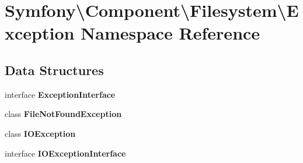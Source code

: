 \section{Symfony\textbackslash{}Component\textbackslash{}Filesystem\textbackslash{}Exception Namespace Reference}
\label{namespace_symfony_1_1_component_1_1_filesystem_1_1_exception}
\subsection*{Data Structures}
\begin{DoxyCompactItemize}
\item 
interface {\bf Exception\+Interface}
\item 
class {\bf File\+Not\+Found\+Exception}
\item 
class {\bf I\+O\+Exception}
\item 
interface {\bf I\+O\+Exception\+Interface}
\end{DoxyCompactItemize}
